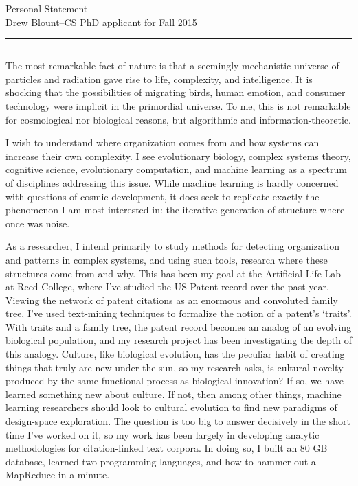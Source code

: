 \documentclass{article}
\newcommand{\soptitle}{Personal Statement}
\newcommand{\yourname}{Drew Blount}
\begin{document}
\begin{center}\LARGE\soptitle\\
\large \yourname\---CS PhD applicant for Fall 2015
\end{center}

\hrule
\vspace{1pt}
\hrule height 1pt

\bigskip


The most remarkable fact of nature is that a seemingly mechanistic universe of particles and radiation gave rise to life, complexity, and intelligence. It is shocking that the possibilities of migrating birds, human emotion, and consumer technology were implicit in the primordial universe. To me, this is not remarkable for cosmological nor biological reasons, but algorithmic and information-theoretic.

I wish to understand where organization comes from and how systems can increase their own complexity. I see evolutionary biology, complex systems theory, cognitive science, evolutionary computation, and machine learning as a spectrum of disciplines addressing this issue. While machine learning is hardly concerned with questions of cosmic development, it does seek to replicate exactly the phenomenon I am most interested in: the iterative generation of structure where once was noise.

As a researcher, I intend primarily to study methods for detecting organization and patterns in complex systems, and using such tools, research where these structures come from and why. This has been my goal at the Artificial Life Lab at Reed College, where I've studied the US Patent record over the past year. Viewing the network of patent citations as an enormous and convoluted family tree, I've used  text-mining techniques to formalize the notion of a patent's `traits'. With traits and a family tree, the patent record becomes an analog of an evolving biological population, and my research project has been investigating the depth of this analogy. Culture, like biological evolution, has the peculiar habit of creating things that truly are new under the sun, so my research asks, is cultural novelty produced by the same functional process as biological innovation? If so, we have learned something new about culture. If not, then among other things, machine learning researchers should look to cultural evolution to find new paradigms of design-space exploration. The question is too big to answer decisively in the short time I've worked on it, so my work has been largely in developing analytic methodologies for citation-linked text corpora. In doing so, I built an 80 GB database, learned two programming languages, and how to hammer out a MapReduce in a minute. 
\end{document}
